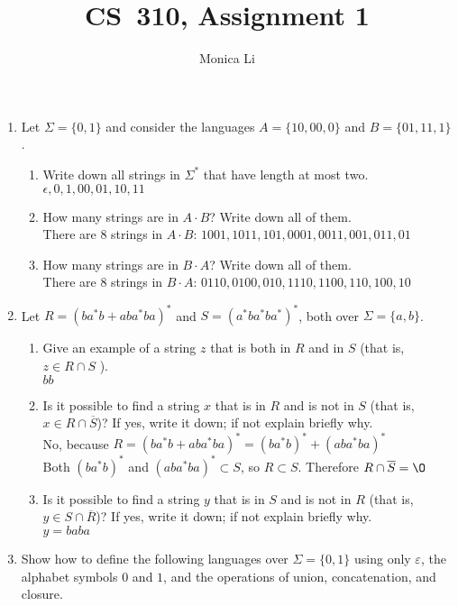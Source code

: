 \documentclass[11pt]{article}
\begin{document}
\title{CS~310, Assignment 1} 
 \author{Monica Li}
 \maketitle

\begin{enumerate}

\item Let $\Sigma = \{0, 1\}$ and consider the languages
  $A = \{10, 00, 0\}$ and $B = \{01, 11, 1\}$.
  \begin{enumerate}
  \item Write down all strings in $\Sigma^{*}$ that have length at
    most two. \\
    $\epsilon, 0, 1, 00, 01, 10, 11$
  \item How many strings are in $A \cdot B$?  Write down all of them.\\
  There are 8 strings in $A \cdot B$: $1001, 1011, 101, 0001, 0011, 001, 011, 01$
  \item How many strings are in $B \cdot A$?  Write down all of them. \\
  There are 8 strings in $B \cdot A$: $0110, 0100, 010, 1110, 1100, 110, 100, 10$
  \end{enumerate}
\item Let $R = (ba^{*}b + aba^{*}ba)^{*}$ and
  $S = (a^{*}ba^{*}ba^{*})^{*}$, both over $\Sigma=\{a,b\}$.
  \begin{enumerate}
  \item Give an example of a string $z$ that is both in $R$ and in $S$
    (that is, $z \in R \cap S$ ). \\
    $bb$
  \item Is it possible to find a string $x$ that is in $R$ and is not
    in $S$ (that is, $x \in R \cap \overline{S}$)?  If yes, write it
    down; if not explain briefly why. \\
    No, because $R = (ba^{*}b + aba^{*}ba)^{*} = (ba^{*}b)^{*} + (aba^{*}ba)^{*} $\\
    Both $(ba^{*}b)^{*}$ and $(aba^{*}ba)^{*} \subset S$, so $R \subset S $. Therefore $R \cap \overline{S} = \O$
  \item Is it possible to find a string $y$ that is in $S$ and is not
    in $R$ (that is, $y \in S \cap \overline{R}$)?  If yes, write it
    down; if not explain briefly why. \\
    $y = baba$ 
  \end{enumerate}
\item Show how to define the following languages over
  $\Sigma = \{0, 1\}$ using only $\varepsilon$, the alphabet symbols
  $0$ and $1$, and the operations of union, concatenation, and
  closure.


\end{enumerate}
\end{document}
